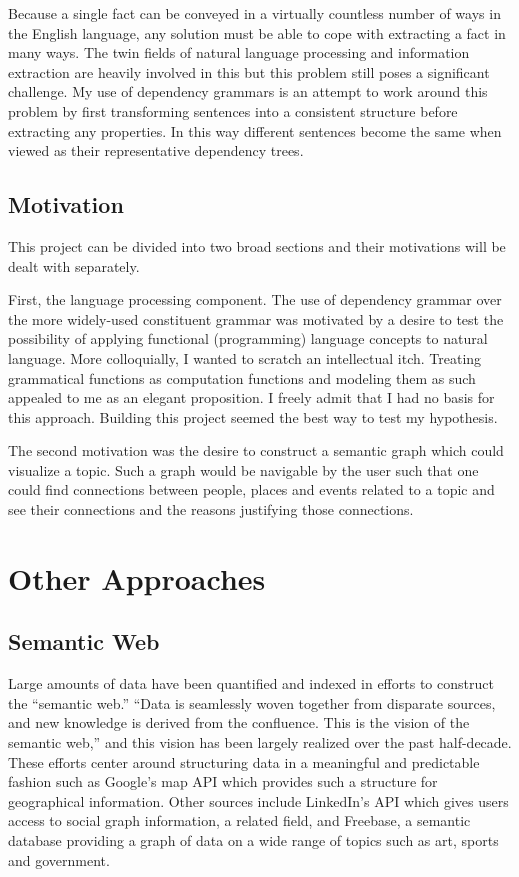 Because a single fact can be conveyed in a virtually countless number of ways in the English language, any solution must be able to cope with extracting a fact in many ways.  The twin fields of natural language processing and information extraction are heavily involved in this but this problem still poses a significant challenge.  My use of dependency grammars is an attempt to work around this problem by first transforming sentences into a consistent structure before extracting any properties.  In this way different sentences become the same when viewed as their representative dependency trees.

\section{Motivation}

This project can be divided into two broad sections and their motivations will be dealt with separately.

First, the language processing component. The use of dependency grammar over the more widely-used constituent grammar was motivated by a desire to test the possibility of applying functional (programming) language concepts to natural language.  More colloquially, I wanted to scratch an intellectual itch.  Treating grammatical functions as computation functions and modeling them as such appealed to me as an elegant proposition.  I freely admit that I had no basis for this approach.  Building this project seemed the best way to test my hypothesis.

The second motivation was the desire to construct a semantic graph which could visualize a topic.  Such a graph would be navigable by the user such that one could find connections between people, places and events related to a topic and see their connections and the reasons justifying those connections.  

\chapter{Other Approaches}

\section{Semantic Web}

Large amounts of data have been quantified and indexed in efforts to construct the ``semantic web.''  ``Data is seamlessly woven together from disparate sources, and new knowledge is derived from the confluence.  This is the vision of the semantic web,'' \cite{semweb} and this vision has been largely realized over the past half-decade.  These efforts center around structuring data in a meaningful and predictable fashion such as Google's map API which provides such a structure for geographical information.  Other sources include LinkedIn's API which gives users access to social graph information, a related field, and Freebase, a semantic database providing a graph of data on a wide range of topics such as art, sports and government.

